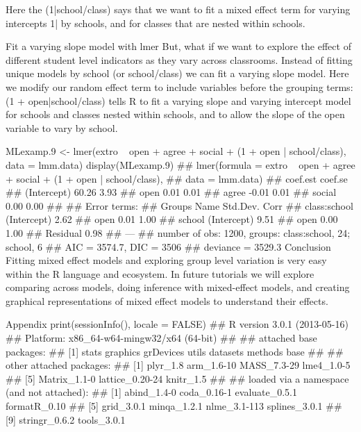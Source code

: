 Here the (1|school/class) says that we want to fit a mixed effect term for varying intercepts 1| by schools, and for classes that are nested within schools.

Fit a varying slope model with lmer
But, what if we want to explore the effect of different student level indicators as they vary across classrooms. Instead of fitting unique models by school (or school/class) we can fit a varying slope model. Here we modify our random effect term to include variables before the grouping terms: (1 + open|school/class) tells R to fit a varying slope and varying intercept model for schools and classes nested within schools, and to allow the slope of the open variable to vary by school.

MLexamp.9 <- lmer(extro ~ open + agree + social + (1 + open | school/class), 
    data = lmm.data)
display(MLexamp.9)
## lmer(formula = extro ~ open + agree + social + (1 + open | school/class), 
##     data = lmm.data)
##             coef.est coef.se
## (Intercept) 60.26     3.93  
## open         0.01     0.01  
## agree       -0.01     0.01  
## social       0.00     0.00  
## 
## Error terms:
##  Groups       Name        Std.Dev. Corr 
##  class:school (Intercept) 2.62          
##               open        0.01     1.00 
##  school       (Intercept) 9.51          
##               open        0.00     1.00 
##  Residual                 0.98          
## ---
## number of obs: 1200, groups: class:school, 24; school, 6
## AIC = 3574.7, DIC = 3506
## deviance = 3529.3
Conclusion
Fitting mixed effect models and exploring group level variation is very easy within the R language and ecosystem. In future tutorials we will explore comparing across models, doing inference with mixed-effect models, and creating graphical representations of mixed effect models to understand their effects.

Appendix
print(sessionInfo(), locale = FALSE)
## R version 3.0.1 (2013-05-16)
## Platform: x86_64-w64-mingw32/x64 (64-bit)
## 
## attached base packages:
## [1] stats     graphics  grDevices utils     datasets  methods   base     
## 
## other attached packages:
## [1] plyr_1.8        arm_1.6-10      MASS_7.3-29     lme4_1.0-5     
## [5] Matrix_1.1-0    lattice_0.20-24 knitr_1.5      
## 
## loaded via a namespace (and not attached):
##  [1] abind_1.4-0    coda_0.16-1    evaluate_0.5.1 formatR_0.10  
##  [5] grid_3.0.1     minqa_1.2.1    nlme_3.1-113   splines_3.0.1 
##  [9] stringr_0.6.2  tools_3.0.1
